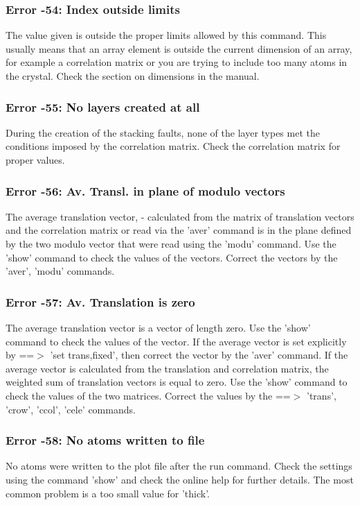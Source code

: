 \subsubsection{Error -54: Index outside limits}
\par
The value given is outside the proper limits allowed by this command. 
This usually means that an array element is outside the current 
dimension of an array, for example a correlation matrix or you are 
trying to include too many atoms in the crystal. Check the section 
on dimensions in the manual. 
\subsubsection{Error -55: No layers created at all}
\par
During the creation of the stacking faults, none of the layer types 
met the conditions imposed by the correlation matrix. Check the 
correlation matrix for proper values. 
\subsubsection{Error -56: Av. Transl. in plane of modulo vectors}
\par
The average translation vector, - calculated from the matrix of 
translation vectors and the correlation matrix or read via the 'aver' 
command is in the plane defined by the two modulo vector that were 
read using the 'modu' command. 
Use the 'show' command to check the values of the vectors. Correct 
the vectors by the 'aver', 'modu' commands. 
\subsubsection{Error -57: Av. Translation is zero}
\par
The average translation vector is a vector of length zero. 
Use the 'show' command to check the values of the vector. 
If the average vector is set explicitly by ==$> $ 'set trans,fixed', then 
correct the vector by the 'aver' command. 
If the average vector is calculated from the translation and correlation 
matrix, the weighted sum of translation vectors is equal to zero. 
Use the 'show' command to check the values of the two matrices. 
Correct the values by the ==$> $ 'trans', 'crow', 'ccol', 'cele' commands. 
\subsubsection{Error -58: No atoms written to file}
\par
No atoms were written to the plot file after the run command. Check 
the settings using the command 'show' and check the online help for 
further details. The most common problem is a too small value for 
'thick'. 
